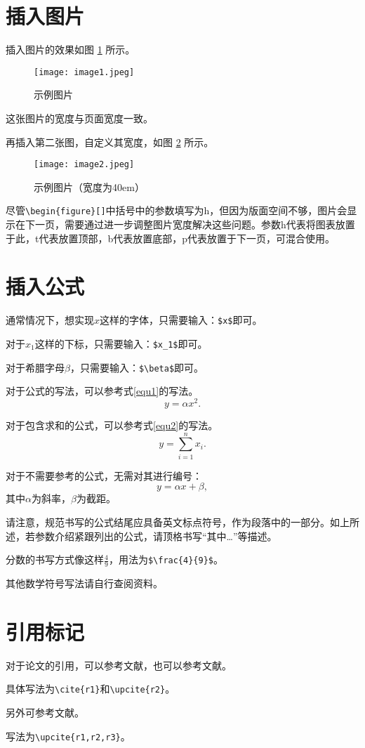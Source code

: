 \documentclass{GZHUMaster}
\begin{document}
\section{插入图片}
插入图片的效果如图 \ref{img1} 所示。\par
\begin{figure}[h]
  \centering
  \texttt{[image: image1.jpeg]}
  \caption{示例图片}
  \label{img1}
\end{figure}
这张图片的宽度与页面宽度一致。\par
再插入第二张图，自定义其宽度，如图 \ref{img2} 所示。\par
\begin{figure}[h]
  \centering
  \texttt{[image: image2.jpeg]}
  \caption{示例图片（宽度为40em）}
  \label{img2}
\end{figure}
尽管\verb|\begin{figure}[]|中括号中的参数填写为h，但因为版面空间不够，图片会显示在下一页，需要通过进一步调整图片宽度解决这些问题。参数h代表将图表放置于此，t代表放置顶部，b代表放置底部，p代表放置于下一页，可混合使用。
\section{插入公式}
通常情况下，想实现$x$这样的字体，只需要输入：\verb|$x$|即可。\par
对于$x_1$这样的下标，只需要输入：\verb|$x_1$|即可。\par
对于希腊字母$\beta$，只需要输入：\verb|$\beta$|即可。\par
对于公式的写法，可以参考式\ref{equ1}的写法。
\begin{equation}
  y=\alpha x^2. \tag*{（2-1）}
  \label{equ1}
\end{equation}\par
对于包含求和的公式，可以参考式\ref{equ2}的写法。
\begin{equation}
  y=\sum_{i=1}^{n}x_i. \tag*{（2-2）}
  \label{equ2}
\end{equation}\par
对于不需要参考的公式，无需对其进行编号：
\[y=\alpha x + \beta,\]
其中$\alpha$为斜率，$\beta$为截距。\par
请注意，规范书写的公式结尾应具备英文标点符号，作为段落中的一部分。如上所述，若参数介绍紧跟列出的公式，请顶格书写“其中\dots”等描述。\par
分数的书写方式像这样$\frac{4}{9}$，用法为\verb|$\frac{4}{9}$|。\par
其他数学符号写法请自行查阅资料。
\section{引用标记}
对于论文的引用，可以参考文献\cite{r1}，也可以参考文献。\par
具体写法为\verb|\cite{r1}|和\verb|\upcite{r2}|。\par
另外可参考文献。\par
写法为\verb|\upcite{r1,r2,r3}|。
\end{document}
